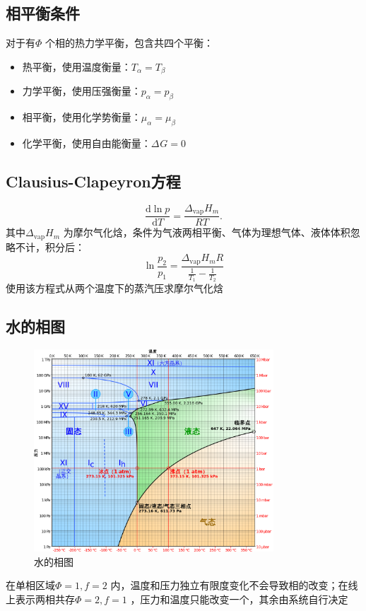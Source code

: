 \subsection{相平衡条件}%
\label{sub:相平衡条件}
对于有$\Phi$ 个相的热力学平衡，包含共四个平衡：
\begin{itemize}
    \item 热平衡，使用温度衡量：$T_{\alpha}= T_{\beta}$
    \item 力学平衡，使用压强衡量：$p_{\alpha} = p_{\beta}$ 
    \item 相平衡，使用化学势衡量：$\mu_{\alpha}=\mu_{\beta}$
    \item 化学平衡，使用自由能衡量：$\Delta_\text{}G = 0 $
\end{itemize}
\subsection{Clausius-Clapeyron方程}%
\label{sub:Clausius-Clapeyron方程}
\[
    \frac{\mathrm{d}\ln p}{\mathrm{d}T} = \frac{\Delta_\text{vap}H_{m} }{RT} 
.\]
其中$\Delta_\text{vap}H_{m} $ 为摩尔气化焓，条件为气液两相平衡、气体为理想气体、液体体积忽略不计，积分后：
\begin{equation}
    \label{eq:int-clausius}
    \ln \frac{p_2}{p_1} = \frac{\Delta_\text{vap}H_{m} R}{\frac{1}{T_1}-\frac{1}{T_2}}
\end{equation}
使用该方程式从两个温度下的蒸汽压求摩尔气化焓
\subsection{水的相图}%
\label{sub:水的相图}
\begin{figure}[htpb]
    \centering
    \includegraphics[width=0.8\textwidth]{./figures/水的相图.png}
    \caption{水的相图}
    \label{fig:figures-水的相图-png}
\end{figure}
在单相区域$\Phi=1,f=2$ 内，温度和压力独立有限度变化不会导致相的改变；在线上表示两相共存$\Phi=2,f=1$ ，压力和温度只能改变一个，其余由系统自行决定
